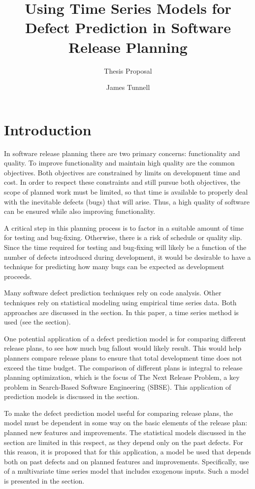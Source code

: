 \documentclass[a4paper]{scrartcl}
\begin{document}
\title{Using Time Series Models for Defect Prediction in Software Release Planning}
\subtitle{Thesis Proposal}
\author{James Tunnell}
\maketitle

\section*{Introduction}
In software release planning there are two primary concerns: functionality and quality. To improve functionality and maintain high quality are the common objectives. Both objectives are constrained by limits on development time and cost. In order to respect these constraints and still pursue both objectives, the scope of planned work must be limited, so that time is available to properly deal with the inevitable defects (bugs) that will arise. Thus, a high quality of software can be ensured while also improving functionality.

A critical step in this planning process is to factor in a suitable amount of time for testing and bug-fixing. Otherwise, there is a risk of schedule or quality slip. Since the time required for testing and bug-fixing will likely be a function of the number of defects introduced during development, it would be desirable to have a technique for predicting how many bugs can be expected as development proceeds.

Many software defect prediction techniques rely on code analysis. Other techniques rely on statistical modeling using empirical time series data. Both approaches are discussed in the  section. In this paper, a time series method is used (see the  section).

One potential application of a defect prediction model is for comparing different release plans, to see how much bug fallout would likely result. This would help planners compare release plans to ensure that total development time does not exceed the time budget. The comparison of different plans is integral to release planning optimization, which is the focus of The Next Release Problem, a key problem in Search-Based Software Engineering (SBSE). This application of prediction models is discussed in the  section.

To make the defect prediction model useful for comparing release plans, the model must be dependent in some way on the basic elements of the release plan: planned new features and improvements. The statistical models discussed in the  section are limited in this respect, as they depend only on the past defects. For this reason, it is proposed that for this application, a model be used that depends both on past defects and on planned features and improvements. Specifically, use of a multivariate time series model that includes exogenous inputs. Such a model is presented in the  section.
\end{document}
